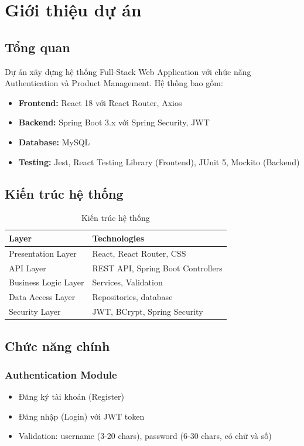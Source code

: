 \section{Giới thiệu dự án}

\subsection{Tổng quan}
Dự án xây dựng hệ thống Full-Stack Web Application với chức năng Authentication và Product Management. Hệ thống bao gồm:

\begin{itemize}
    \item \textbf{Frontend:} React 18 với React Router, Axios
    \item \textbf{Backend:} Spring Boot 3.x với Spring Security, JWT
    \item \textbf{Database:} MySQL
    \item \textbf{Testing:} Jest, React Testing Library (Frontend), JUnit 5, Mockito (Backend)
\end{itemize}

\subsection{Kiến trúc hệ thống}

\begin{table}[H]
\centering
\begin{tabular}{|l|l|}
\hline
\textbf{Layer} & \textbf{Technologies} \\
\hline
Presentation Layer & React, React Router, CSS \\
\hline
API Layer & REST API, Spring Boot Controllers \\
\hline
Business Logic Layer & Services, Validation \\
\hline
Data Access Layer & Repositories, database \\
\hline
Security Layer & JWT, BCrypt, Spring Security \\
\hline
\end{tabular}
\caption{Kiến trúc hệ thống}
\end{table}

\subsection{Chức năng chính}

\subsubsection{Authentication Module}
\begin{itemize}
    \item Đăng ký tài khoản (Register)
    \item Đăng nhập (Login) với JWT token
    \item Validation: username (3-20 chars), password (6-30 chars, có chữ và số)
\end{itemize}

